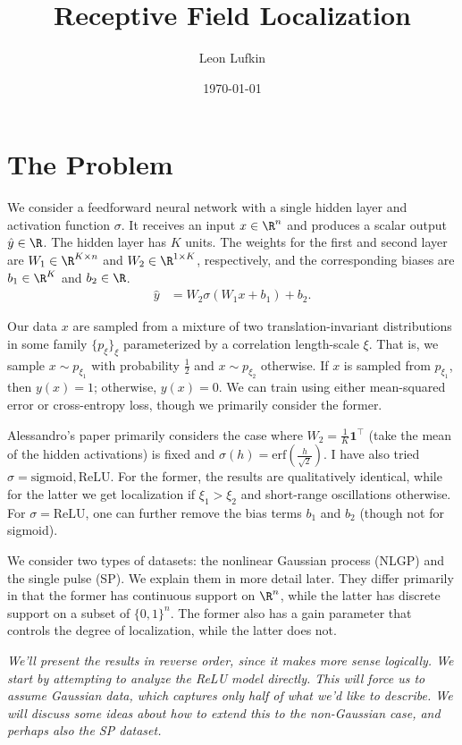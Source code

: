 \documentclass{article}
\title{Receptive Field Localization}
\author{Leon Lufkin}
\date{\today}
\begin{document}
\section{The Problem}
We consider a feedforward neural network with a single hidden layer and activation function $\sigma$.
It receives an input $x \in \R^n$ and produces a scalar output $\hat{y} \in \R$.
The hidden layer has $K$ units.
The weights for the first and second layer are $W_1 \in \R^{K \times n}$ and $W_2 \in \R^{1 \times K}$, respectively, and the corresponding biases are $b_1 \in \R^K$ and $b_2 \in \R$.
\begin{align}
  \hat{y} &= W_2 \sigma( W_1 x + b_1 ) + b_2. \label{eq:model}
\end{align}

Our data $x$ are sampled from a mixture of two translation-invariant distributions in some family $\{ p_\xi \}_{\xi}$ parameterized by a correlation length-scale $\xi$.
That is, we sample $x \sim p_{\xi_1}$ with probability $\frac{1}{2}$ and $x \sim p_{\xi_2}$ otherwise.
If $x$ is sampled from $p_{\xi_1}$, then $y(x) = 1$; otherwise, $y(x) = 0$. 
We can train using either mean-squared error or cross-entropy loss, though we primarily consider the former. 

Alessandro's paper primarily considers the case where $W_2 = \frac{1}{K} \mathbf{1}^\top$ (take the mean of the hidden activations) is fixed and $\sigma(h) = \text{erf}(\frac{h}{\sqrt{2}})$.
I have also tried $\sigma = \text{sigmoid}, \text{ReLU}$.
For the former, the results are qualitatively identical, while for the latter we get localization if $\xi_1 > \xi_2$ and short-range oscillations otherwise.
For $\sigma = \text{ReLU}$, one can further remove the bias terms $b_1$ and $b_2$ (though not for sigmoid).

We consider two types of datasets: the nonlinear Gaussian process (NLGP) and the single pulse (SP).
We explain them in more detail later.
They differ primarily in that the former has continuous support on $\R^n$, while the latter has discrete support on a subset of $\{ 0, 1 \}^n$.
The former also has a gain parameter that controls the degree of localization, while the latter does not. 

\emph{We'll present the results in reverse order, since it makes more sense logically.
We start by attempting to analyze the ReLU model directly.
This will force us to assume Gaussian data, which captures only half of what we'd like to describe.
We will discuss some ideas about how to extend this to the non-Gaussian case, and perhaps also the SP dataset.}
\end{document}
